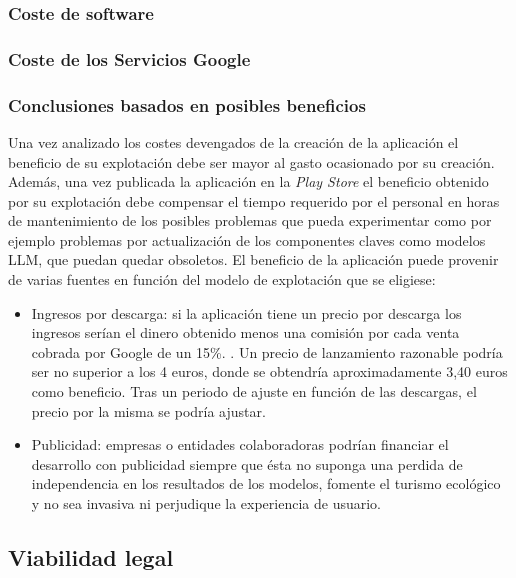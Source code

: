 	
\subsubsection{Coste de software}

\subsubsection{Coste de los Servicios Google}
\subsubsection{Conclusiones basados en posibles beneficios}
Una vez analizado los costes devengados de la creación de la aplicación el beneficio de su explotación debe ser mayor al gasto ocasionado por su creación. Además, una vez publicada la aplicación en la \textit{Play Store} el beneficio obtenido por su explotación debe compensar el tiempo requerido por el personal en horas de mantenimiento de los posibles problemas que pueda experimentar como por ejemplo problemas por actualización de los componentes claves como modelos LLM, que puedan quedar obsoletos. El beneficio de la aplicación puede provenir de varias fuentes en función del modelo de explotación que se eligiese:
\begin{itemize}
	\item{Ingresos por descarga:} si la aplicación tiene un precio por descarga los ingresos serían el dinero obtenido menos una comisión por cada venta cobrada por Google de un 15\%. \cite{googleplay_commission}.
	Un precio de lanzamiento razonable podría ser no superior a los 4 euros, donde se obtendría aproximadamente 3,40 euros como beneficio. Tras un periodo de ajuste en función de las descargas, el precio por la misma se podría ajustar.
	\item{Publicidad:} empresas o entidades colaboradoras podrían financiar el desarrollo con publicidad siempre que ésta no suponga una perdida de independencia en los resultados de los modelos, fomente el turismo ecológico y no sea invasiva ni perjudique la experiencia de usuario.
	
\end{itemize}
\subsection{Viabilidad legal}


